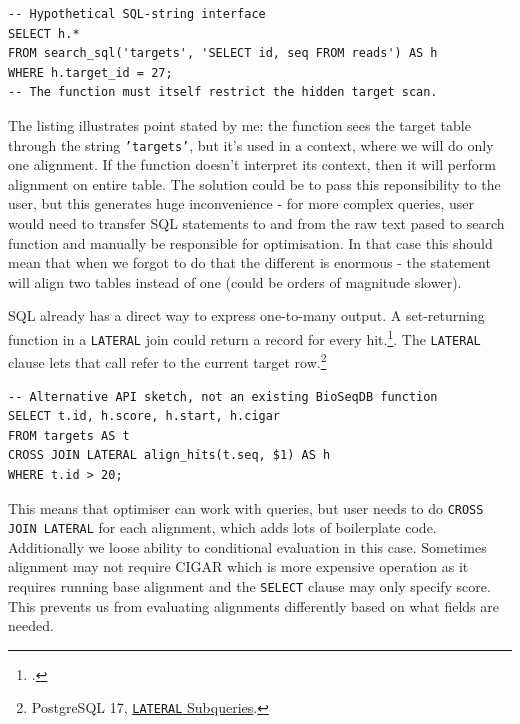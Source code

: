 \noindent\begin{minipage}{\linewidth}
\begin{lstlisting}[style=bioseq-search-sql,caption={An outer condition cannot automatically filter a hidden scan.}]
-- Hypothetical SQL-string interface
SELECT h.*
FROM search_sql('targets', 'SELECT id, seq FROM reads') AS h
WHERE h.target_id = 27;
-- The function must itself restrict the hidden target scan.
\end{lstlisting}
\end{minipage}

The listing illustrates point stated by me: the function sees the target table through the string \texttt{'targets'}, but it's used in a context, where we will do only one alignment. If the function doesn't interpret its context, then it will perform alignment on entire table.
The solution could be to pass this reponsibility to the user, but this generates huge inconvenience - for more complex queries, user would need to transfer SQL statements to and from the raw text pased to search function and manually be responsible for optimisation. In that case this should mean that
when we forgot to do that the different is enormous - the statement will align two tables instead of one (could be orders of magnitude slower).

SQL already has a direct way to express one-to-many output. A set-returning
function in a \texttt{LATERAL} join could return a record for every
hit.\footcite{postgresql17_set_returning_functions}. The \texttt{LATERAL} clause
lets that call refer to the current target row.\footnote{PostgreSQL 17,
\href{https://www.postgresql.org/docs/17/queries-table-expressions.html\#QUERIES-LATERAL}
{\texttt{LATERAL} Subqueries}.}

\noindent\begin{minipage}{\linewidth}
\begin{lstlisting}[style=bioseq-search-sql,caption={Different API example}]
-- Alternative API sketch, not an existing BioSeqDB function
SELECT t.id, h.score, h.start, h.cigar
FROM targets AS t
CROSS JOIN LATERAL align_hits(t.seq, $1) AS h
WHERE t.id > 20;
\end{lstlisting}
\end{minipage}

This means that optimiser can work with queries, but user needs to do \texttt{CROSS JOIN LATERAL} for each alignment, which adds lots of boilerplate code.
Additionally we loose ability to conditional evaluation in this case. Sometimes alignment may not require CIGAR which is more expensive operation as it requires running base alignment and the \texttt{SELECT} clause may only
specify score. This prevents us from evaluating alignments differently based on what fields are needed.


